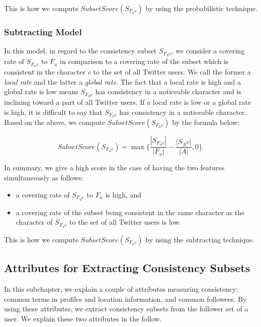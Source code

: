This is how we compute $\mathit{SubsetScore(S_{F_uc})}$ by using
the probabilistic technique.

\subsubsection{Subtracting Model}
\label{subsubsec:Subtracting}

In this model, in regard to the consistency subset $S_{F_uc}$, we
consider a covering rate of $S_{F_uc}$ to $F_u$ in comparison to a
covering rate of the subset which is consistent in the character $c$ to the set of
all Twitter users.  We call the former a \emph{local rate} and the
latter a \emph{global rate}.  The fact that a local rate is high and a
global rate is low means $S_{F_uc}$ has consistency in a noticeable
character and is inclining toward a part of all Twitter
users.  If a local rate is low or a global rate is high, it is difficult
to say that $S_{F_uc}$ has consistency in a noticeable character.  Based
on the above, we compute $\mathit{SubsetScore(S_{F_uc})}$ by the formula
below:

\vspace{-1ex}
\[
 \mathit{SubsetScore}(S_{F_uc}) = \max \{\frac{|S_{F_uc}|}{|F_u|} -
 \frac{|S_Ac|}{|A|}, 0\}.
\]
\vspace{-2ex}

In summary, we give a high score in the case of having the two features
simultaneously as follows:

\begin{itemize}
\item a covering rate of $S_{F_uc}$ to $F_u$ is high, and
\item a covering rate of the subset being consistent in the same
      character as the character of $S_{F_uc}$ to the set of all Twitter
      users is low.
\end{itemize}

This is how we compute $\mathit{SubsetScore(S_{F_uc})}$ by using
the subtracting technique.

\subsection{Attributes for Extracting Consistency Subsets}
\label{subsec:Attributes}

In this subchapter, we explain a couple of attributes measuring
consistency: common terms in profiles and location information, and
common followees.  By using these attributes, we extract consistency
subsets from the follower set of a user.  We explain these two
attributes in the follow.

